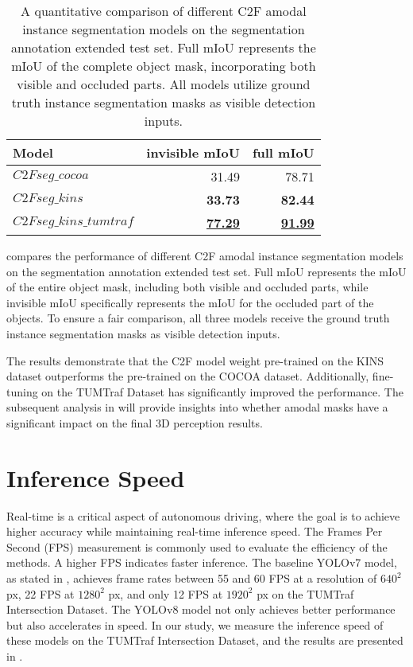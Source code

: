 \begin{table}[htb]%
	\centering%
	\begin{minipage}{\textwidth}
		\centering
		\begin{tabular}{lrr}
			\toprule
			\textbf{Model} & \textbf{invisible mIoU} & \textbf{full mIoU} \\
			\midrule
			$C2Fseg\_cocoa$ &  31.49 &  78.71\\
			$C2Fseg\_kins$ &  \textbf{33.73} &  \textbf{82.44}\\
			$C2Fseg\_kins\_tumtraf$  & \textbf{\underline{77.29}}  & \textbf{\underline{91.99}}  \\
			\bottomrule
		\end{tabular}
	\end{minipage}
	\caption{A quantitative comparison of different C2F amodal instance segmentation models on the segmentation annotation extended test set. Full mIoU represents the mIoU of the complete object mask, incorporating both visible and occluded parts. All models utilize ground truth instance segmentation masks as visible detection inputs.}
	\label{tab:2d_amodal_quantitative}%
\end{table}

 compares the performance of different C2F amodal instance segmentation models on the segmentation annotation extended test set. Full mIoU represents the mIoU of the entire object mask, including both visible and occluded parts, while invisible mIoU specifically represents the mIoU for the occluded part of the objects. To ensure a fair comparison, all three models receive the ground truth instance segmentation masks as visible detection inputs. 

The results demonstrate that the C2F model weight pre-trained on the KINS dataset outperforms the pre-trained on the COCOA dataset. Additionally, fine-tuning on the TUMTraf Dataset has significantly improved the performance. The subsequent analysis in  will provide insights into whether amodal masks have a significant impact on the final 3D perception results.

\section{Inference Speed} \label{sec:inference_speed}

Real-time is a critical aspect of autonomous driving, where the goal is to achieve higher accuracy while maintaining real-time inference speed. The Frames Per Second (FPS) measurement is commonly used to evaluate the efficiency of the methods. A higher FPS indicates faster inference. The baseline YOLOv7 model, as stated in \cite{thesisJoseph}, achieves frame rates between 55 and 60 FPS at a resolution of $640^2$ px, 22 FPS at $1280^2$  px, and only 12 FPS at $1920^2$ px on the TUMTraf Intersection Dataset. The YOLOv8 model not only achieves better performance but also accelerates in speed. In our study, we measure the inference speed of these models on the TUMTraf Intersection Dataset, and the results are presented in . 

